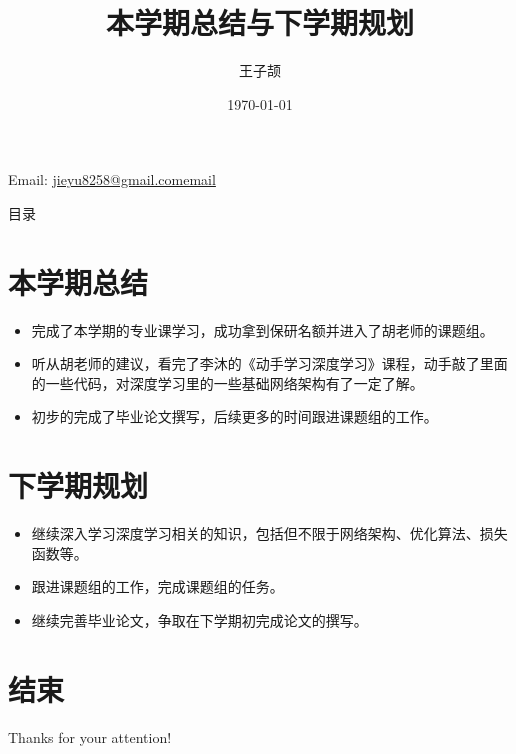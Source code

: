 \documentclass[aspectratio=169]{beamer}
\title{本学期总结与下学期规划}
\author{王子颉}
\institute{School of Computer and Informatics, HFUT}
\date{\today}
\makeatletter
\newcommand{\contactinfo}{
  \begin{center}
    Email: \href{mailto:jieyu8258@gmail.com}{jieyu8258@gmail.comemail}
  \end{center}
}
\makeatother
\begin{document}
\begin{frame}
	\maketitle
	\contactinfo
\end{frame}

\begin{frame}{目录}
	\tableofcontents
\end{frame}

\section{本学期总结}

\begin{frame}
  \begin{itemize}
    \item 完成了本学期的专业课学习，成功拿到保研名额并进入了胡老师的课题组。\pause
    \item 听从胡老师的建议，看完了李沐的《动手学习深度学习》课程，动手敲了里面的一些代码，对深度学习里的一些基础网络架构有了一定了解。\pause
    \item 初步的完成了毕业论文撰写，后续更多的时间跟进课题组的工作。
  \end{itemize}
\end{frame}

\section{下学期规划}

\begin{frame}
  \begin{itemize}
    \item 继续深入学习深度学习相关的知识，包括但不限于网络架构、优化算法、损失函数等。\pause
    \item 跟进课题组的工作，完成课题组的任务。\pause
    \item 继续完善毕业论文，争取在下学期初完成论文的撰写。
  \end{itemize}
\end{frame}

\section{结束}

\begin{frame}
	\begin{center}
    {\Huge\calligra Thanks for your attention!}
  \end{center}
\end{frame}
\end{document}
